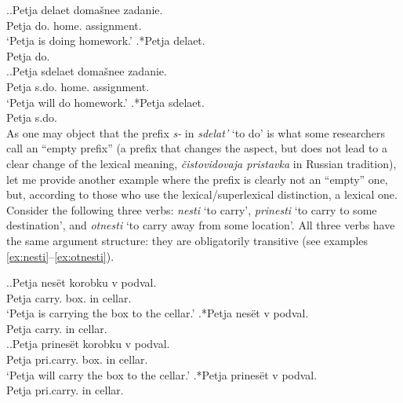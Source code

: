 \ex.\label{ex:delat}\ag.Petja delaet\textsuperscript{\IPF} doma\v{s}nee zadanie.\\
Petja do. home. assignment.\\
\trans `Petja is doing homework.'
\bg.*Petja delaet\textsuperscript{\IPF}.\\
Petja do.\\

\ex.\label{ex:sdelat}\ag.Petja sdelaet\textsuperscript{\PF} doma\v{s}nee zadanie.\\
Petja s.do. home. assignment.\\
\trans `Petja will do homework.'
\bg.*Petja sdelaet\textsuperscript{\PF}.\\
Petja s.do.\\


As one may object that the prefix \textit{s-} in \textit{sdelat'} `to do' is what some researchers call an ``empty prefix'' (a prefix that changes the aspect, but does not lead to a clear change of the lexical meaning, \textit{\v{c}istovidovaja pristavka} in Russian tradition), let me provide another example where the prefix is clearly not an ``empty'' one, but, according to those who use the lexical/superlexical distinction, a lexical one.  Consider the following three verbs: \textit{nesti\textsuperscript{\IPF}} `to carry', \textit{prinesti\textsuperscript{\PF}} `to carry to some destination',  and \textit{otnesti\textsuperscript{\PF}} `to carry away from some location'. All three verbs have the same argument structure: they are obligatorily transitive (see examples \ref{ex:nesti}--\ref{ex:otnesti}).

\ex.\label{ex:nesti}\ag.Petja nes\"{e}t\textsuperscript{\IPF} korobku v podval.\\
Petja carry. box. in cellar.\\
\trans `Petja is carrying the box to the cellar.'
\bg.*Petja nes\"{e}t\textsuperscript{\IPF} v podval.\\
Petja carry. in cellar.\\

\ex.\label{ex:prinesti}\ag.Petja prines\"{e}t\textsuperscript{\PF} korobku v podval.\\
Petja pri.carry. box. in cellar.\\
\trans `Petja will carry the box to the cellar.'
\bg.*Petja prines\"{e}t\textsuperscript{\PF} v podval.\\
Petja pri.carry. in cellar.\\


